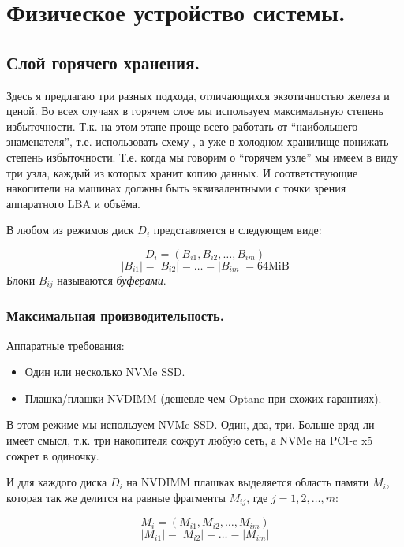 \documentclass[a4paper,12pt]{article}
\begin{document}
\newpage
\section{Физическое устройство системы.}

\subsection{Слой горячего хранения.}

Здесь я предлагаю три разных подхода, отличающихся экзотичностью железа и ценой. Во всех случаях в горячем слое мы используем максимальную степень избыточности.
Т.к. на этом этапе проще всего работать от \enquote{наибольшего знаменателя}, т.е. использовать схему , а уже в холодном хранилище понижать степень избыточности.
Т.е. когда мы говорим о \enquote{горячем узле} мы имеем в виду три узла, каждый из которых хранит копию данных. И соответствующие накопители на машинах должны быть
эквивалентными с точки зрения аппаратного LBA и объёма.

В любом из режимов диск $D_i$ представляется в следующем виде:

$$D_i = \left(B_{i1}, B_{i2}, \dots, B_{im}\right) $$
$$ |B_{i1}| = |B_{i2}| = \dots = |B_{im}| = 64\text{MiB}$$
Блоки $B_{ij}$ называются \textit{буферами}.



\subsubsection{Максимальная производительность.}

Аппаратные требования:

\begin{itemize}
\item Один или несколько NVMe SSD.
\item Плашка/плашки NVDIMM (дешевле чем Optane при схожих гарантиях).
\end{itemize}

В этом режиме мы используем NVMe SSD. Один, два, три. Больше вряд ли имеет смысл, т.к. три накопителя сожрут любую сеть, а NVMe на PCI-e x5 сожрет в одиночку.


\smallskip
И для каждого диска $D_i$ на NVDIMM плашках выделяется область памяти $M_i$, которая так же делится на равные фрагменты $M_{ij}$, где $j = 1, 2, \dots, m$:

$$M_i = \left(M_{i1}, M_{i2}, \dots, M_{im}\right)$$
$$|M_{i1}| = |M_{i2}| = \dots = |M_{im}|$$
\end{document}

